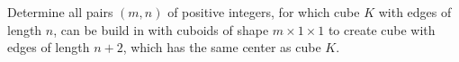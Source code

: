 Determine all pairs $(m, n)$ of positive integers, for which cube $K$ with edges of length $n$, can be build in with cuboids of shape $m \times 1 \times 1$ to create cube with edges of length $n + 2$, which has the same center as cube $K$.